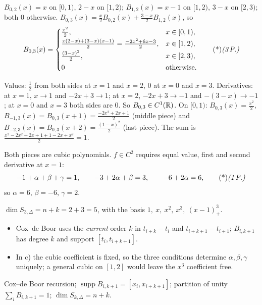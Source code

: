 \begin{solution}
 $B_{0,2}(x)=x$ on $[0,1)$, $2-x$ on $[1,2)$; $B_{1,2}(x)=x-1$ on $[1,2)$, $3-x$ on $[2,3)$; both $0$ otherwise. 
$B_{0,3}(x)=\frac x2B_{0,2}(x)+\frac{3-x}2B_{1,2}(x)$, so
\[
B_{0,3}(x)=\begin{cases}\frac{x^2}2,&x\in[0,1),\\[2pt]\frac{x(2-x)+(3-x)(x-1)}2=\frac{-2x^2+6x-3}2,&x\in[1,2),\\[2pt]\frac{(3-x)^2}2,&x\in[2,3),\\[2pt]0&\text{otherwise.}\end{cases}\ptd{3}
\]

 Values: $\frac12$ from both sides at $x=1$ and $x=2$, $0$ at $x=0$ and $x=3$. Derivatives: at $x=1$, $x\to1$ and $-2x+3\to1$; at $x=2$, $-2x+3\to-1$ and $-(3-x)\to-1$; at $x=0$ and $x=3$ both sides are $0$. So $B_{0,3}\in C^1(\mathbb{R})$. 
On $[0,1)$: $B_{0,3}(x)=\frac{x^2}2$, $B_{-1,3}(x)=B_{0,3}(x+1)=\frac{-2x^2+2x+1}2$ (middle piece) and $B_{-2,3}(x)=B_{0,3}(x+2)=\frac{(1-x)^2}2$ (last piece). The sum is $\frac{x^2-2x^2+2x+1+1-2x+x^2}2=1$. 

 Both pieces are cubic polynomials. $f\in C^2$ requires equal value, first and second derivative at $x=1$:
\[
-1+\alpha+\beta+\gamma=1,\qquad -3+2\alpha+\beta=3,\qquad -6+2\alpha=6,\ptd{1}
\]
so $\alpha=6$, $\beta=-6$, $\gamma=2$. 

 $\dim S_{3,\Delta}=n+k=2+3=5$, with the basis $1,\ x,\ x^2,\ x^3,\ (x-1)_+^3$. 

\begin{trap}
\begin{itemize}
\item Cox--de Boor uses the \emph{current} order $k$ in $t_{i+k}-t_i$ and $t_{i+k+1}-t_{i+1}$; $B_{i,k+1}$ has degree $k$ and support $[t_i,t_{i+k+1}]$.
\item In c) the cubic coefficient is fixed, so the three conditions determine $\alpha,\beta,\gamma$ uniquely; a general cubic on $[1,2]$ would leave the $x^3$ coefficient free.
\end{itemize}
\end{trap}
\begin{heart}
Cox--de Boor recursion; $\operatorname{supp}B_{i,k+1}=[x_i,x_{i+k+1}]$; partition of unity $\sum_iB_{i,k+1}=1$; $\dim S_{k,\Delta}=n+k$.
\end{heart}
\end{solution}


